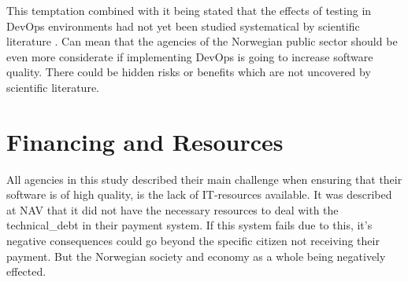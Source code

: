 This temptation combined with it being stated that the effects of testing in DevOps environments had not yet been studied systematical by scientific literature \cite{dsc_2019}\cite{ja_2016}. Can mean that the agencies of the Norwegian public sector should be even more considerate if implementing DevOps is going to increase software quality. There could be hidden risks or benefits which are not uncovered by scientific literature.





\section{Financing and Resources}
All agencies in this study described their main challenge when ensuring that their software is of high quality, is the lack of IT-resources available. It was described at NAV that it did not have the necessary resources to deal with the \gls{technical_debt} in their payment system. If this system fails due to this, it's negative consequences could go beyond the specific citizen not receiving their payment. But the Norwegian society and economy as a whole being negatively effected. 

